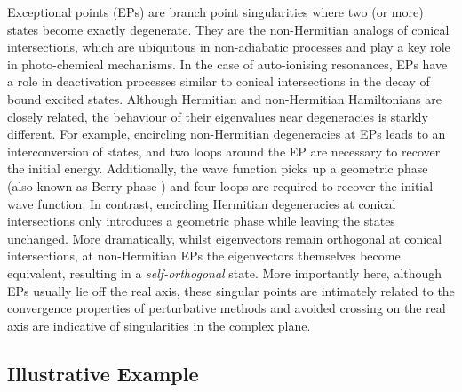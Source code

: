 \documentclass[aps,prb,reprint,noshowkeys,superscriptaddress]{revtex4-1}
\begin{document}
Exceptional points (EPs) are branch point singularities where two (or more) states become exactly degenerate. \cite{MoiseyevBook,Heiss_1988,Heiss_1990,Heiss_1999,Berry_2011,Heiss_2012,Heiss_2016,Benda_2018}
They are the non-Hermitian analogs of conical intersections, \cite{Yarkony_1996} which are ubiquitous in non-adiabatic processes and play a key role in photo-chemical mechanisms.
In the case of auto-ionising resonances, EPs have a role in deactivation processes similar to conical intersections in the decay of bound excited states. \cite{Benda_2018}
Although Hermitian and non-Hermitian Hamiltonians are closely related, the behaviour of their eigenvalues near degeneracies is starkly different.
For example, encircling non-Hermitian degeneracies at EPs leads to an interconversion of states, and two loops around the EP are necessary to recover the initial energy. \cite{MoiseyevBook,Heiss_2016,Benda_2018}
Additionally, the wave function picks up a geometric phase (also known as Berry phase \cite{Berry_1984}) and four loops are required to recover the initial wave function.
In contrast, encircling Hermitian degeneracies at conical intersections only introduces a geometric phase while leaving the states unchanged.
More dramatically, whilst eigenvectors remain orthogonal at conical intersections, at non-Hermitian EPs the eigenvectors themselves become equivalent, resulting in a \textit{self-orthogonal} state. \cite{MoiseyevBook}
More importantly here, although EPs usually lie off the real axis, these singular points are intimately related to the convergence properties of perturbative methods and avoided crossing on the real axis are indicative of singularities in the complex plane. \cite{BenderBook,Olsen_1996,Olsen_2000,Olsen_2019,Mihalka_2017a,Mihalka_2017b,Mihalka_2019}

\subsection{Illustrative Example}
\label{sec:example}
\end{document}
